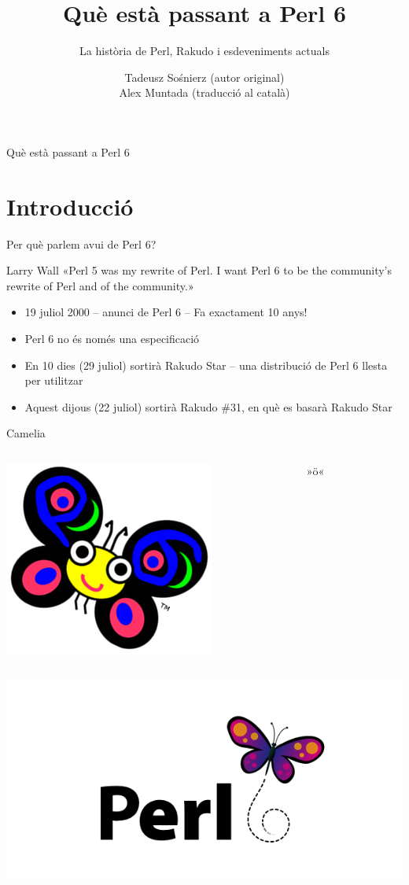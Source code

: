 \documentclass{beamer}
\title{Què està passant a Perl 6}
\subtitle{La història de Perl, Rakudo i esdeveniments actuals}
\author{Tadeusz Sośnierz (autor original)\\
Alex Muntada (traducció al català)}
\begin{document}
\begin{frame}{Què està passant a Perl 6}
	\titlepage
\end{frame}

			\section{Introducció}

\begin{frame}{Per què parlem avui de Perl 6?}
	\begin{block}{Larry Wall}
		«Perl 5 was my rewrite of Perl. I want Perl 6 to be
		the community's rewrite of Perl
		and of the community.»
	\end{block}
	\pause
	\begin{itemize}
		\item 19 juliol 2000 -- anunci de Perl 6
			-- Fa exactament 10 anys!
		\pause
		\item Perl 6 no és només una especificació
		\pause
		\item En 10 dies (29 juliol) sortirà Rakudo Star
			-- una distribució de Perl 6 llesta per utilitzar
		\pause
		\item Aquest dijous (22 juliol) sortirà Rakudo \#31,
			en què es basarà Rakudo Star
	\end{itemize}
\end{frame}

\begin{frame}{Camelia}
	\begin{columns}
		\begin{column}{0.5\textwidth}
			\includegraphics[scale=0.54]{camelia}
		\end{column}
		\begin{column}{0.5\textwidth}
			{\Huge »ö«}
		\end{column}
	\end{columns}
	\includegraphics[scale=0.38]{newlogo}
\end{frame}
\end{document}
